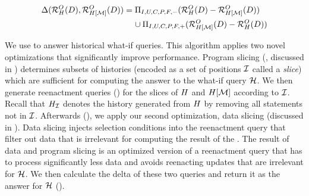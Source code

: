 \begin{align*}
  \Delta(\mathcal{R}^{O}_{H}(D),\mathcal{R}^{O}_{H[\mathcal{M}]}(D))&=  \Pi_{I,U,C,P,F,-}(\mathcal{R}^{O}_{H}(D)- \mathcal{R}^{O}_{H[\mathcal{M}]}(D))\\
                                                                            &\hspace{4mm}  \cup \Pi_{I,U,C,P,F,+}(\mathcal{R}^{O}_{H[\mathcal{M}]}(D)-\mathcal{R}^{O}_{H}(D))
\end{align*}

We use  to answer historical what-if queries. This algorithm applies two novel optimizations that significantly improve  performance. Program slicing (, discussed in )  determines subsets of histories (encoded as a set of positions $\mathcal{I}$ called a \emph{slice}) which are sufficient for computing the answer to the what-if query $\mathcal{H}$. We then generate reenactment queries ()  for the slices of $H$ and $H[\mathcal{M}]$ according to $\mathcal{I}$. Recall that ${H}_{\mathcal{I}}$ denotes the history generated from $H$ by removing all statements not in $\mathcal{I}$. Afterwards (), we apply our second optimization, data slicing (discussed in ). Data slicing injects selection conditions into the reenactment query that filter out data that is irrelevant for computing the result of the \abbrHW. The result of data and program slicing is an optimized version of a reenactment query that has to process significantly less data and avoids reenacting updates that are irrelevant for $\mathcal{H}$. We then calculate the delta of these two queries and return it as the answer for $\mathcal{H}$ ().

